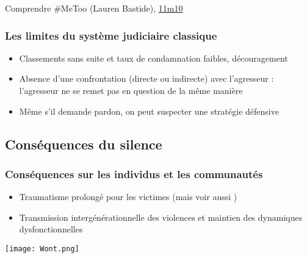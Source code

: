 \documentclass[french]{beamer}
\begin{document}
\begin{frame}
\begin{block}{Comprendre \#MeToo (Lauren Bastide), \href{https://podcasts.musixmatch.com/podcast/01gz0dx010r13t2j6yymscmvrf/episode/01gz0dx010r13t2j6yymscmvrp?time=670.945}{11m10}}
\begin{quote}
    \end{quote}
  \end{block}
\end{frame}

\begin{frame}
  \frametitle{Les limites du système judiciaire classique}
  \begin{itemize}
    \item Classements sans suite et taux de condamnation faibles, découragement
    \item Absence d’une confrontation (directe ou indirecte) avec l’agresseur : l’agresseur ne se remet pas en question de la même manière
    \item Même s’il demande pardon, on peut suspecter une stratégie défensive
  \end{itemize}
\end{frame}

\subsection{Conséquences du silence}
\begin{frame}
  \frametitle{Conséquences sur les individus et les communautés}
  \begin{itemize}
    \item Traumatisme prolongé pour les victimes {\small (mais voir aussi \citet{lilienfeld_50_2009})}
    \item Transmission intergénérationnelle des violences et maintien des dynamiques dysfonctionnelles
  \end{itemize}
  \begin{center}
    \texttt{[image: Wont.png]}
  \end{center}
\end{frame}
\end{document}
